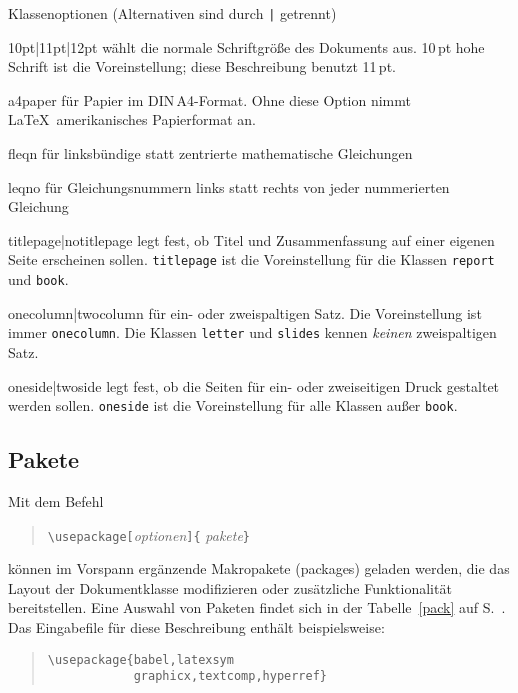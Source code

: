 \begin{table}[hbpt]
\caption[Klassenoptionen]{Klassenoptionen (Alternativen sind durch \texttt{|}
  getrennt)} \label{options}
\oben{11cm}
\begin{ttdescription}%
\item [10pt|11pt|12pt] wählt die normale Schriftgröße des Dokuments aus.
  10\,pt hohe Schrift ist die Voreinstellung; diese Beschreibung benutzt 11\,pt.

\item[a4paper] für Papier im DIN\,A4-Format. Ohne diese
  Option nimmt \LaTeX\ amerikanisches Papierformat an.
 
\item [fleqn] für linksbündige statt zentrierte mathematische
  Gleichungen
 
\item [leqno] für Gleichungsnummern links statt rechts von jeder
  nummerierten Gleichung
 
\item [titlepage|notitlepage] legt fest, ob Titel und Zusammenfassung
  auf einer eigenen Seite erscheinen sollen.  \texttt{titlepage} ist
  die Voreinstellung für die Klassen \texttt{report} und \texttt{book}.
 
\item [onecolumn|twocolumn] für ein- oder zweispaltigen Satz.
 Die Voreinstellung ist immer \texttt{onecolumn}.  
 Die Klassen \texttt{letter} und \texttt{slides} kennen \emph{keinen}
 zweispaltigen Satz.
 
\item [oneside|twoside] legt fest, ob die Seiten für ein- oder
  zweiseitigen  Druck gestaltet werden sollen.  
  \texttt{oneside} ist die Voreinstellung für
  alle Klassen außer \texttt{book}.
  
\end{ttdescription}
\unten
\end{table}



\subsection{Pakete}\label{packages}
 
Mit dem Befehl
\begin{verse}
\verb:\usepackage[:\textit{optionen}\verb:]{:%
  \textit{pakete}\verb:}:
\end{verse}
können im Vorspann ergänzende Makropakete (packages) geladen werden,
die das Layout der Dokumentklasse
modifizieren oder zusätzliche Funktionalität bereitstellen.
Eine Auswahl von Paketen findet sich in der Tabelle~\ref{pack} 
auf S.~\pageref{pack}.
Das Eingabefile für diese Beschreibung enthält beispielsweise:
\begin{verse}
\verb|\usepackage{babel,latexsym|\\
\verb|            graphicx,textcomp,hyperref}|
\end{verse}


